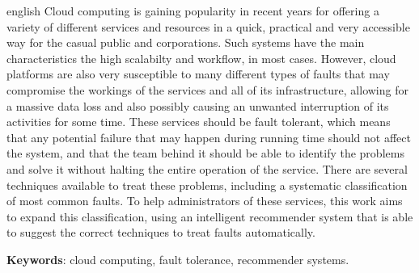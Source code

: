 \documentclass[
	12pt,				%
	a4paper,			%
	english,			%
	french,				%
	spanish,			%
	brazil				%
	]{abntex2}
\newcommand{\listofquadrosname}{Lista de quadros}
\begin{document}
\begin{resumo}[Abstract]
 \begin{otherlanguage*}{english}
   Cloud computing is gaining popularity in recent years for offering a variety of different services and resources in a quick, practical and very accessible way for the casual public and corporations. Such systems have the main characteristics the high scalabilty and workflow, in most cases. However, cloud platforms are also very susceptible to many different types of faults that may compromise the workings of the services and all of its infrastructure, allowing for a massive data loss and also possibly causing an unwanted interruption of its activities for some time. These services should be fault tolerant, which means that any potential failure that may happen during running time should not affect the system, and that the team behind it should be able to identify the problems and solve it without halting the entire operation of the service. There are several techniques available to treat these problems, including a systematic classification of most common faults. To help administrators of these services, this work aims to expand this classification, using an intelligent recommender system that is able to suggest the correct techniques to treat faults automatically.

   \vspace{\onelineskip}
 
   \noindent 
   \textbf{Keywords}: cloud computing, fault tolerance, recommender systems.
 \end{otherlanguage*}
\end{resumo}

\listoffigures*
\cleardoublepage

\pdfbookmark[0]{\listofquadrosname}{loq}
\listofquadros*
\cleardoublepage

\listoftables*
\cleardoublepage

\end{document}
